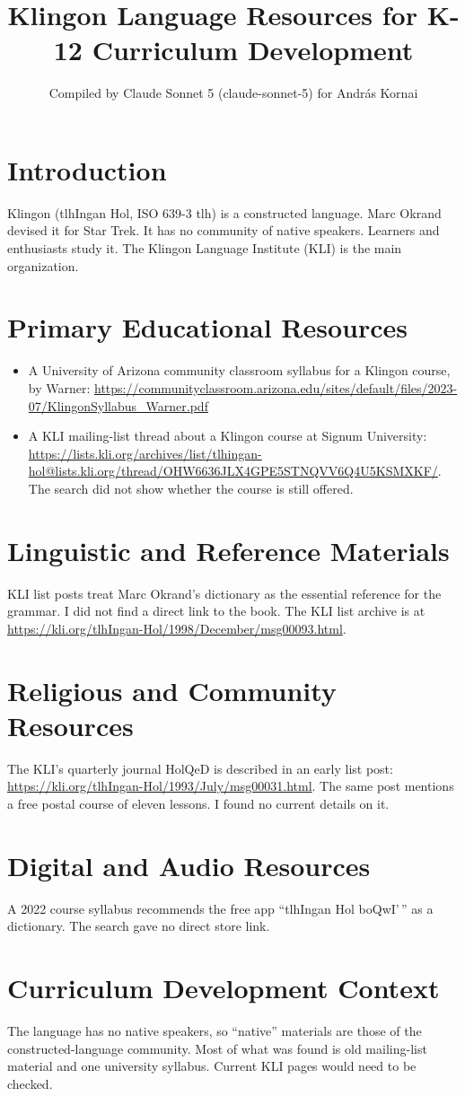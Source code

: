 \documentclass[12pt]{article}
\title{Klingon Language Resources for K-12 Curriculum Development}
\author{Compiled by Claude Sonnet 5 (claude-sonnet-5) for Andr\'as Kornai}
\date{}
\begin{document}
\maketitle

\section{Introduction}
Klingon (tlhIngan Hol, ISO 639-3 tlh) is a constructed language. Marc Okrand devised it for Star Trek. It has no community of native speakers. Learners and enthusiasts study it. The Klingon Language Institute (KLI) is the main organization.

\section{Primary Educational Resources}
\begin{itemize}
\item A University of Arizona community classroom syllabus for a Klingon course, by Warner: \url{https://communityclassroom.arizona.edu/sites/default/files/2023-07/KlingonSyllabus_Warner.pdf}
\item A KLI mailing-list thread about a Klingon course at Signum University: \url{https://lists.kli.org/archives/list/tlhingan-hol@lists.kli.org/thread/OHW6636JLX4GPE5STNQVV6Q4U5KSMXKF/}. The search did not show whether the course is still offered.
\end{itemize}

\section{Linguistic and Reference Materials}
KLI list posts treat Marc Okrand's dictionary as the essential reference for the grammar. I did not find a direct link to the book. The KLI list archive is at \url{https://kli.org/tlhIngan-Hol/1998/December/msg00093.html}.

\section{Religious and Community Resources}
The KLI's quarterly journal HolQeD is described in an early list post: \url{https://kli.org/tlhIngan-Hol/1993/July/msg00031.html}. The same post mentions a free postal course of eleven lessons. I found no current details on it.

\section{Digital and Audio Resources}
A 2022 course syllabus recommends the free app ``tlhIngan Hol boQwI'\,'' as a dictionary. The search gave no direct store link.

\section{Curriculum Development Context}
The language has no native speakers, so ``native'' materials are those of the constructed-language community. Most of what was found is old mailing-list material and one university syllabus. Current KLI pages would need to be checked.
\end{document}
